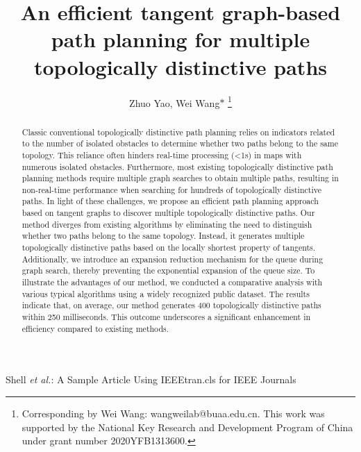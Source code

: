 \documentclass[letterpaper, 10 pt, journal, twoside]{IEEEtran}
\begin{document}
\title{An efficient tangent graph-based path planning for multiple topologically distinctive paths}

\author{Zhuo Yao, Wei Wang$\ast$
\thanks{Corresponding by Wei Wang: wangweilab@buaa.edu.cn.
This work was supported by the National Key Research and Development Program of China under grant number 2020YFB1313600.}
}

%
{Shell \MakeLowercase{\textit{et al.}}: A Sample Article Using IEEEtran.cls for IEEE Journals}


\maketitle

\begin{abstract}

Classic conventional topologically distinctive path planning relies on indicators related to the number of isolated obstacles to determine whether two paths belong to the same topology. This reliance often hinders real-time processing (\textless 1s) in maps with numerous isolated obstacles. Furthermore, most existing topologically distinctive path planning methods require multiple graph searches to obtain multiple paths, resulting in non-real-time performance when searching for hundreds of topologically distinctive paths. In light of these challenges, we propose an efficient path planning approach based on tangent graphs to discover multiple topologically distinctive paths. Our method diverges from existing algorithms by eliminating the need to distinguish whether two paths belong to the same topology. Instead, it generates multiple topologically distinctive paths based on the locally shortest property of tangents. Additionally, we introduce an expansion reduction mechanism for the queue during graph search, thereby preventing the exponential expansion of the queue size. To illustrate the advantages of our method, we conducted a comparative analysis with various typical algorithms using a widely recognized public dataset. The results indicate that, on average, our method generates 400 topologically distinctive paths within 250 milliseconds. This outcome underscores a significant enhancement in efficiency compared to existing methods. 


\end{abstract}
\end{document}
